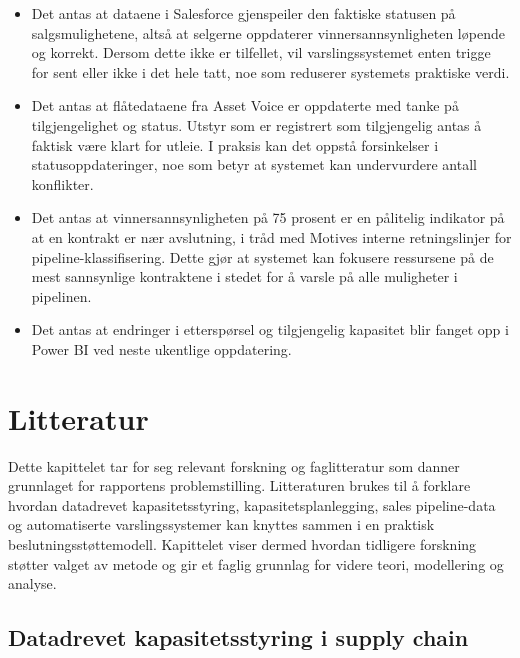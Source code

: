 \documentclass[a4paper,11pt]{article}
\begin{document}
\begin{itemize}
\item Det antas at dataene i Salesforce gjenspeiler den faktiske statusen på salgsmulighetene, altså at selgerne oppdaterer vinnersannsynligheten løpende og korrekt. Dersom dette ikke er tilfellet, vil varslingssystemet enten trigge for sent eller ikke i det hele tatt, noe som reduserer systemets praktiske verdi.  
\item Det antas at flåtedataene fra Asset Voice er oppdaterte med tanke på tilgjengelighet og status. Utstyr som er registrert som tilgjengelig antas å faktisk være klart for utleie. I praksis kan det oppstå forsinkelser i statusoppdateringer, noe som betyr at systemet kan undervurdere antall konflikter.  
\item Det antas at vinnersannsynligheten på 75 prosent er en pålitelig indikator på at en kontrakt er nær avslutning, i tråd med Motives interne retningslinjer for pipeline-klassifisering. Dette gjør at systemet kan fokusere ressursene på de mest sannsynlige kontraktene i stedet for å varsle på alle muligheter i pipelinen.  
\item Det antas at endringer i etterspørsel og tilgjengelig kapasitet blir fanget opp i Power BI ved neste ukentlige oppdatering.
\end{itemize}

\section{Litteratur}

Dette kapittelet tar for seg relevant forskning og faglitteratur som danner grunnlaget for rapportens problemstilling. Litteraturen brukes til å forklare hvordan datadrevet kapasitetsstyring, kapasitetsplanlegging, sales pipeline-data og automatiserte varslingssystemer kan knyttes sammen i en praktisk beslutningsstøttemodell. Kapittelet viser dermed hvordan tidligere forskning støtter valget av metode og gir et faglig grunnlag for videre teori, modellering og analyse.

\subsection{Datadrevet kapasitetsstyring i supply chain}
\end{document}
